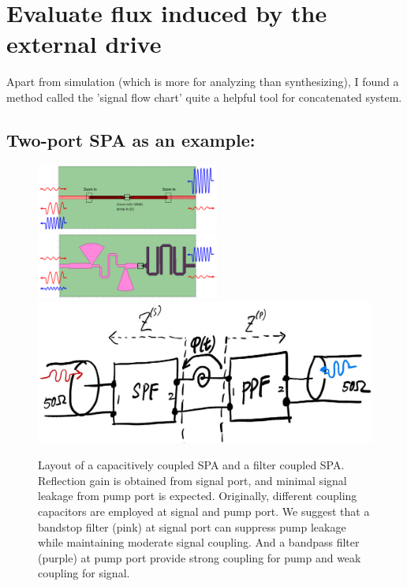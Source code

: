 \documentclass{article}
\begin{document}
\newpage
\section{Evaluate flux induced by the external drive}

Apart from simulation (which is more for analyzing than synthesizing), I found a method called the 'signal flow chart' quite a helpful tool for concatenated system. 

\subsection{Two-port SPA as an example:}

\begin{figure}[h]
{\label{fig:device1}
\includegraphics[width=6cm]{figures/SPA.PNG}
}
{\label{fig:device2}
\includegraphics[width=6cm]{figures/FSPA.PNG}
}
{\includegraphics[width=12cm]{figures/SPA_diagram.jpg}
\label{fig:circuit_1} 
}
\caption
{\label{fig:device} Layout of a capacitively coupled SPA and a filter coupled SPA. Reflection gain is obtained from signal port, and minimal signal leakage from pump port is expected. Originally, different coupling capacitors are employed at signal and pump port. We suggest that a bandstop filter (pink) at signal port can suppress pump leakage while maintaining moderate signal coupling. And a bandpass filter (purple) at pump port provide strong coupling for pump and weak coupling for signal. }
\end{figure}
\end{document}

